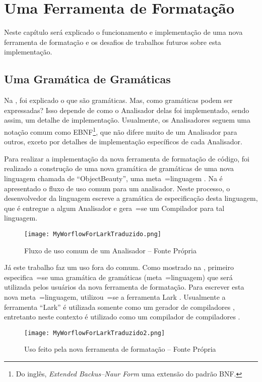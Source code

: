 

\chapter{Uma Ferramenta de Formatação}
\label{software_implementation}

Neste capítulo será explicado o funcionamento e
implementação de uma nova ferramenta de formatação e
os desafios de trabalhos futuros sobre esta implementação.


\section{Uma Gramática de Gramáticas}

Na ,
foi explicado o que são gramáticas.
Mas,
como gramáticas podem ser expressadas?
Isso depende de como o Analisador delas foi implementado,
sendo assim,
um detalhe de implementação.
Usualmente,
os Analisadores seguem uma notação comum como EBNF\footnote{
Do inglês,
\textit{Extended Backus–Naur Form} uma extensão do padrão BNF.
}\cite{teachingEbnf,antlrBookTerrentParr},
que não difere muito de um Analisador para outros,
exceto por detalhes de implementação específicos de cada Analisador.

Para realizar a implementação da nova ferramenta de formatação de código,
foi realizado a construção de uma nova gramática de gramáticas de uma nova linguagem chamada de ``ObjectBeauty'',
uma meta~=linguagem \cite{compilersCompilerMetaLanguage}.
Na  é apresentado o fluxo de uso comum para um analisador.
Neste processo,
o desenvolvedor da linguagem escreve a gramática de especificação desta linguagem,
que é entregue a algum Analisador e
gera~=se um Compilador para tal linguagem.
\begin{figure}[h]
\centering
\texttt{[image: MyWorflowForLarkTraduzido.png]}
\caption[Fluxo de uso comum de um Analisador]{Fluxo de uso comum de um Analisador -- Fonte Própria \cite{larkErrorRecovery}}
\label{MyWorflowForLarkTraduzido}
\end{figure}

Já este trabalho faz um uso fora do comum.
Como mostrado na ,
primeiro especifica~=se uma gramática de gramáticas (meta~=linguagem) que será utilizada pelos usuários da nova ferramenta de formatação.
Para escrever esta nova meta~=linguagem,
utilizou~=se a ferramenta Lark \cite{larkContextualLexer}.
Usualmente a ferramenta ``Lark'' é utilizada somente como um gerador de compiladores ,
entretanto neste contexto é utilizado como um compilador de compiladores .
\begin{figure}[h]
\centering
\texttt{[image: MyWorflowForLarkTraduzido2.png]}
\caption[Uso feito pela nova ferramenta de formatação]{Uso feito pela nova ferramenta de formatação -- Fonte Própria \cite{larkErrorRecovery}}
\label{MyWorflowForLarkTraduzido2}
\end{figure}

